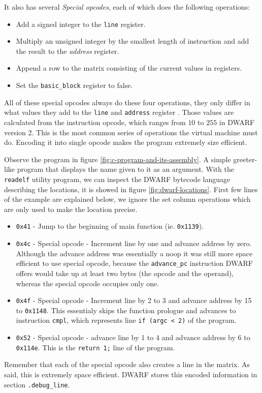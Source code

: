 It also has several \textit{Special opcodes}, each of which does the following
operations:
\begin{itemize}
    \item Add a signed integer to the \texttt{line} register.
    \item Multiply an unsigned integer by the smallest length of instruction
        and add the result to the \textit{address} register.
    \item Append a row to the matrix consisting of the current values in
        registers.
    \item Set the \texttt{basic\_block} register to false.
\end{itemize}
All of these special opcodes always do these four operations, they only differ
in what values they add to the \texttt{line} and \texttt{address} register
\cite{dwarf}. Those values are calculated from the instruction opcode, which
ranges from $10$ to $255$ in DWARF version 2. This is the most common series of
operations the virtual machine must do. Encoding it into single opcode makes
the program extremely size efficient.

Observe the program in figure \ref{fig:c-program-and-its-assembly}. A simple
greeter-like program that displays the name given to it as an argument. With
the \texttt{readelf} utility program, we can inspect the DWARF bytecode
language describing the locations, it is showed in figure \ref{fig:dwarf-locations}. 
First few lines of the example are explained below, we ignore the set column
operations which are only used to make the location precise.
\begin{itemize}
    \item \texttt{0x41} - Jump to the beginning of main function (ie. \texttt{0x1139}).
    \item \texttt{0x4c} - Special opcode - Increment line by one and advance
        address by zero. Although the advance address was essentially a noop it
        was still more space efficient to use special opcode, because the
        \texttt{advance\_pc} instruction DWARF offers would take up at least
        two bytes (the opcode and the operand), whereas
        the special opcode occupies only one.
    \item \texttt{0x4f} - Special opcode - Increment line by 2 to 3 and advance address by 15 to \texttt{0x1148}.
        This essentialy skips the function prologue and advances to instruction \texttt{cmpl}, which represents
        line \texttt{if (argc < 2)} of the program.
    \item \texttt{0x52} - Special opcode - advance line by 1 to 4 and advance address by 6 to \texttt{0x114e}.
        This is the \texttt{return 1;} line of the program.
\end{itemize}
Remember that each of the special opcode also creates a line in the matrix. As
said, this is extremely space efficient. DWARF stores this encoded information
in section \texttt{.debug\_line}.

